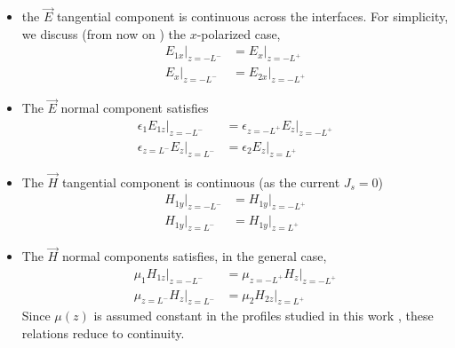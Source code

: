 \documentclass[twocolumn,secnumarabic,amssymb, nobibnotes, aps, prd]{revtex4-1}
\begin{document}
\begin{itemize}
\item  the $\overrightarrow{E}$ tangential component is continuous across the interfaces. For simplicity, we discuss (from now on ) the $x$-polarized case,
\begin{subequations}
\begin{align}
E_{1x}\vert_{z=-L^{-}} &= E_x \vert_{z=-L^+} \\
E_x \vert_{z=-L^-} &= E_{2x}\vert_{z=-L^+}
\end{align}
\end{subequations}

\item The $\overrightarrow{E}$ normal component satisfies
\begin{subequations}
\begin{align}
\epsilon_1 E_{1z}\vert_{z=-L^-} &= \epsilon_{z=-L^+} E_z \vert_{z=-L^+}\\
\epsilon_{z=L^-} E_z \vert_{z=L^-} &= \epsilon_2 E_z \vert_{z=L^+}
\end{align}
\end{subequations} 

\item The $\overrightarrow{H}$ tangential component is continuous (as the current $J_s=0$)
\begin{subequations}
\begin{align}
H_{1y} \vert_{z=-L^-} &= H_{1y} \vert_{z=-L^+} \\
H_{1y} \vert_{z=L^-} &= H_{1y} \vert_{z=L^+}
\end{align}
\end{subequations}

\item The $\overrightarrow{H}$ normal components satisfies, in the general case, 
\begin{subequations}
\begin{align}
\mu_1 H_{1z}\vert_{z=-L^-} &= \mu_{z=-L^+} H_z \vert_{z=-L^+}\\
\mu_{z=L^-} H_z \vert_{z=L^-} &= \mu_2 H_{2z} \vert_{z=L^+}
\end{align}
\end{subequations} 
Since $\mu(z)$ is assumed constant in the profiles studied in this work , these relations reduce to continuity.

\end{itemize} 
\end{document}
